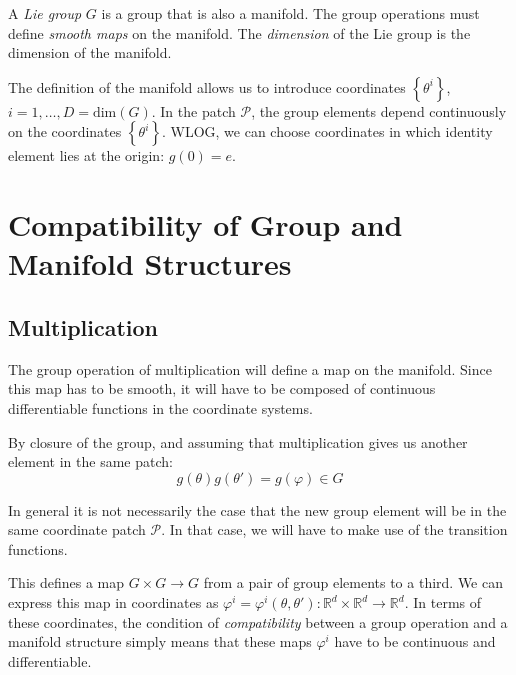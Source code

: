 \begin{definition}
  A \emph{Lie group} $G$ is a group that is also a manifold. The group operations must define \emph{smooth maps} on the manifold.
  The \emph{dimension} of the Lie group is the dimension of the manifold.
\end{definition}

The definition of the manifold allows us to introduce coordinates $\left\{ \theta^i \right\}$, $i = 1, \dots, D = \text{dim}(G)$.
In the patch $\mathcal{P}$, the group elements depend continuously on the coordinates $\left\{ \theta^i \right\}$.
WLOG, we can choose coordinates in which identity element lies at the origin: $g(0) = e$.

\section{Compatibility of Group and Manifold Structures}%

\subsection{Multiplication}%
\label{sub:multiplication}

The group operation of multiplication will define a map on the manifold. Since this map has to be smooth, it will have to be composed of continuous differentiable functions in the coordinate systems.

By closure of the group, and assuming that multiplication gives us another element in the same patch:
\begin{equation}
  g(\theta) g(\theta') = g(\varphi) \in G
\end{equation}
\begin{leftbar}
  \begin{remark}
    In general it is not necessarily the case that the new group element will be in the same coordinate patch $\mathcal{P}$. In that case, we will have to make use of the transition functions.
  \end{remark}
\end{leftbar}
This defines a map $G \times G \to G$ from a pair of group elements to a third.
We can express this map in coordinates as $\varphi^i = \varphi^i(\theta, \theta'): \mathbb{R}^d \times \mathbb{R}^d \to \mathbb{R}^d$.
In terms of these coordinates, the condition of \emph{compatibility} between a group operation and a manifold structure simply means that these maps $\varphi^i$ have to be continuous and differentiable.

